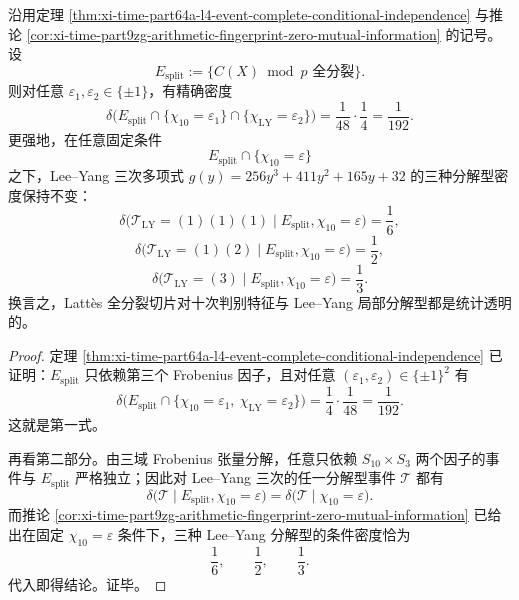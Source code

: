 \begin{theorem}\label{thm:xi-time-part9zr-lattes-fullsplit-transparency}
沿用定理 \ref{thm:xi-time-part64a-l4-event-complete-conditional-independence} 与推论 \ref{cor:xi-time-part9zg-arithmetic-fingerprint-zero-mutual-information} 的记号。设
\[
E_{\mathrm{split}}
:=
\{\text{\(C(X)\bmod p\) 全分裂}\}.
\]
则对任意 \(\varepsilon_1,\varepsilon_2\in\{\pm1\}\)，有精确密度
\[
\delta\!\bigl(
E_{\mathrm{split}}\cap\{\chi_{10}=\varepsilon_1\}\cap\{\chi_{\mathrm{LY}}=\varepsilon_2\}
\bigr)
=
\frac{1}{48}\cdot \frac14
=
\frac{1}{192}.
\]
更强地，在任意固定条件
\[
E_{\mathrm{split}}\cap\{\chi_{10}=\varepsilon\}
\]
之下，Lee--Yang 三次多项式 \(g(y)=256y^3+411y^2+165y+32\) 的三种分解型密度保持不变：
\[
\delta\!\bigl(\mathcal T_{\mathrm{LY}}=(1)(1)(1)\mid E_{\mathrm{split}},\chi_{10}=\varepsilon\bigr)=\frac16,
\]
\[
\delta\!\bigl(\mathcal T_{\mathrm{LY}}=(1)(2)\mid E_{\mathrm{split}},\chi_{10}=\varepsilon\bigr)=\frac12,
\]
\[
\delta\!\bigl(\mathcal T_{\mathrm{LY}}=(3)\mid E_{\mathrm{split}},\chi_{10}=\varepsilon\bigr)=\frac13.
\]
换言之，Latt\`es 全分裂切片对十次判别特征与 Lee--Yang 局部分解型都是统计透明的。
\end{theorem}
\begin{proof}
定理 \ref{thm:xi-time-part64a-l4-event-complete-conditional-independence} 已证明：\(E_{\mathrm{split}}\) 只依赖第三个 Frobenius 因子，且对任意 \((\varepsilon_1,\varepsilon_2)\in\{\pm1\}^2\) 有
\[
\delta\!\bigl(
E_{\mathrm{split}}\cap\{\chi_{10}=\varepsilon_1,\ \chi_{\mathrm{LY}}=\varepsilon_2\}
\bigr)
=
\frac14\cdot\frac{1}{48}
=
\frac{1}{192}.
\]
这就是第一式。

再看第二部分。由三域 Frobenius 张量分解，任意只依赖 \(S_{10}\times S_3\) 两个因子的事件与 \(E_{\mathrm{split}}\) 严格独立；因此对 Lee--Yang 三次的任一分解型事件 \(\mathcal T\) 都有
\[
\delta\!\bigl(\mathcal T\mid E_{\mathrm{split}},\chi_{10}=\varepsilon\bigr)
=
\delta\!\bigl(\mathcal T\mid \chi_{10}=\varepsilon\bigr).
\]
而推论 \ref{cor:xi-time-part9zg-arithmetic-fingerprint-zero-mutual-information} 已给出在固定 \(\chi_{10}=\varepsilon\) 条件下，三种 Lee--Yang 分解型的条件密度恰为
\[
\frac16,\qquad \frac12,\qquad \frac13.
\]
代入即得结论。证毕。
\end{proof}

